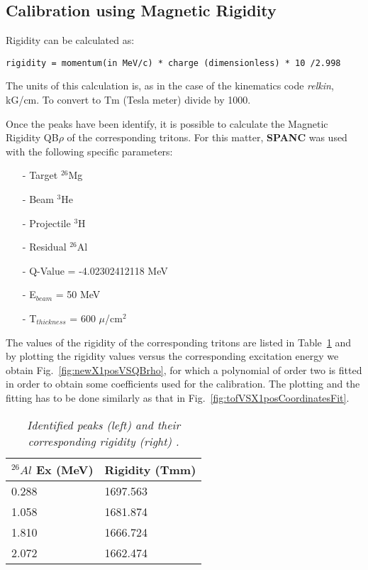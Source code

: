 \documentclass[11pt]{report}
\begin{document}
\subsection{Calibration using Magnetic Rigidity}

\bigskip
{}
\bigskip

Rigidity can be calculated as:
\begin{verbatim}
rigidity = momentum(in MeV/c) * charge (dimensionless) * 10 /2.998
\end{verbatim}
The units of this calculation is, as in the case of the kinematics code
{\it relkin}, kG/cm. To convert to Tm (Tesla meter) divide by 1000.


Once the peaks have been identify, it is possible to calculate the 
Magnetic Rigidity QB$\rho$ of the corresponding tritons. For this matter, \textbf{SPANC} was
used with the following specific parameters:
{\footnotesize
\begin{itemize}
 \setlength\itemsep{0.001em}
\item[-] Target $^{26}$Mg
\item[-] Beam $^{3}$He
\item[-] Projectile $^{3}$H
\item[-] Residual $^{26}$Al
\item[-] Q-Value = -4.02302412118 MeV
\item[-] E$_{beam}$ = 50 MeV
\item[-] T$_{thickness}$ = 600 $\mu$/cm$^{2}$
\end{itemize}
}

\noindent
The values of the rigidity of the corresponding tritons are listed in 
Table~\ref{tab:rigidity} and by plotting the rigidity values versus the corresponding excitation 
energy we obtain Fig.~\ref{fig:newX1posVSQBrho}, for which a polynomial 
of order two is fitted in order to obtain some coefficients used for the calibration. The plotting
and the fitting has to be done similarly as that in Fig.~\ref{fig:tofVSX1posCoordinatesFit}.

\begin{table}[!th]
\centering
\begin{tabular}{|l|l|}
\hline
$^{26}Al$ Ex (MeV)&Rigidity (Tmm)\\
\hline
0.288&1697.563\\
1.058&1681.874\\
1.810&1666.724\\
2.072&1662.474\\
\hline
\end{tabular}
\caption{\it Identified peaks (left) and their corresponding rigidity (right) \cite{nndc}.}
\label{tab:rigidity}



\end{table}
\end{document}
